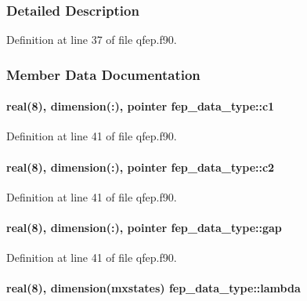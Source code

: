 \subsubsection{Detailed Description}


Definition at line 37 of file qfep.\-f90.



\subsubsection{Member Data Documentation}
\hypertarget{structfep__data__type_a7e3bfc946205d5123cff9b4329deafda}{
\paragraph[{c1}]{\setlength{\rightskip}{0pt plus 5cm}real(8), dimension(\-:), pointer fep\-\_\-data\-\_\-type\-::c1}}\label{structfep__data__type_a7e3bfc946205d5123cff9b4329deafda}


Definition at line 41 of file qfep.\-f90.

\hypertarget{structfep__data__type_a4a8e0e86a443a933c2bd95aa45ad66cb}{
\paragraph[{c2}]{\setlength{\rightskip}{0pt plus 5cm}real(8), dimension(\-:), pointer fep\-\_\-data\-\_\-type\-::c2}}\label{structfep__data__type_a4a8e0e86a443a933c2bd95aa45ad66cb}


Definition at line 41 of file qfep.\-f90.

\hypertarget{structfep__data__type_a21c600fd6d73ea490f80a3bc2014affb}{
\paragraph[{gap}]{\setlength{\rightskip}{0pt plus 5cm}real(8), dimension(\-:), pointer fep\-\_\-data\-\_\-type\-::gap}}\label{structfep__data__type_a21c600fd6d73ea490f80a3bc2014affb}


Definition at line 41 of file qfep.\-f90.

\hypertarget{structfep__data__type_a01e2321f020c7f795ae893e14ffce055}{
\paragraph[{lambda}]{\setlength{\rightskip}{0pt plus 5cm}real(8), dimension(mxstates) fep\-\_\-data\-\_\-type\-::lambda}}\label{structfep__data__type_a01e2321f020c7f795ae893e14ffce055}


